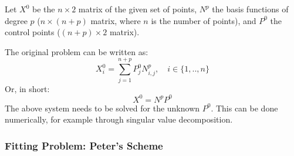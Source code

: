Let $X^{0}$ be the $n \times 2$ matrix of the given set of points, $N^{p}$ the basis functions of degree $p$ ($n \times (n+p)$ matrix, where $n$ is the number of points), and $P^{0}$ the control points ($(n+p) \times 2$ matrix).

The original problem can be written as:
\begin{equation}
X_{i}^{0} = \sum\limits_{j=1}^{n+p} P_{j}^{0} N_{i,j}^{p}, \quad i \in \{1,..,n\}
\end{equation}
Or, in short:
\begin{equation}
X^{0} = N^{p} P^{0}
\end{equation}
The above system needs to be solved for the unknown $P^{0}$. This can be done numerically, for example through singular value decomposition. 

\subsubsection{Fitting Problem: Peter's Scheme}
